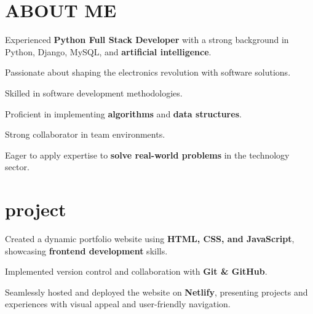 \documentclass[]{deedy-resume-openfont}
\begin{document}
\hfill
\begin{minipage}[t]{0.66\textwidth} 


\section{ABOUT ME }
\vspace{\topsep} %
\begin{tightemize}
\item Experienced\textbf{ Python Full Stack Developer} with a strong background in Python, Django, MySQL, and \textbf{artificial intelligence}.
\item Passionate about shaping the electronics revolution with software solutions. 
\item Skilled in software development methodologies.
\item Proficient in implementing \textbf{algorithms} and \textbf{data structures}.
\item Strong collaborator in team environments.
\item Eager to apply expertise to \textbf{solve real-world problems} in the technology sector.
\end{tightemize}



\section{project}
\vspace{\topsep} %
\begin{tightemize}
\item Created a dynamic portfolio website using \textbf{HTML, CSS, and JavaScript}, showcasing \textbf{frontend development} skills.
\item Implemented version control and collaboration with \textbf{Git \& GitHub}.
\item Seamlessly hosted and deployed the website on \textbf{Netlify}, presenting projects and experiences with visual appeal and user-friendly navigation.
\end{tightemize}
\sectionsep


\end{minipage}
\end{document}
